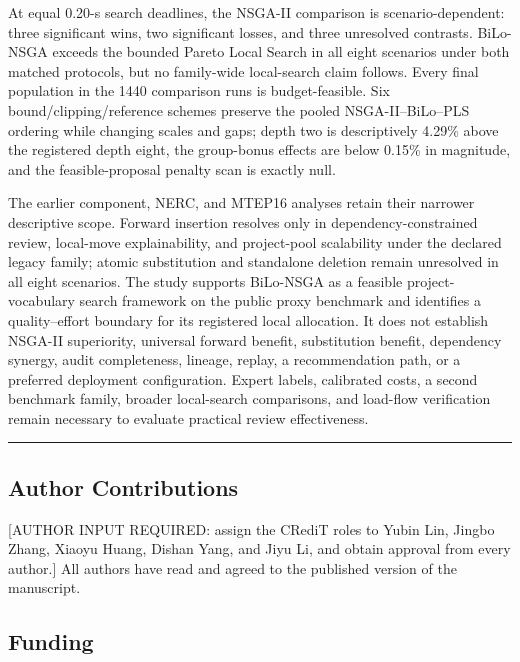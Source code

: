 \documentclass[
]{article}
\begin{document}
At equal 0.20-s search deadlines, the NSGA-II comparison is scenario-dependent: three significant wins, two significant losses, and three unresolved contrasts. BiLo-NSGA exceeds the bounded Pareto Local Search in all eight scenarios under both matched protocols, but no family-wide local-search claim follows. Every final population in the 1440 comparison runs is budget-feasible. Six bound/clipping/reference schemes preserve the pooled NSGA-II--BiLo--PLS ordering while changing scales and gaps; depth two is descriptively 4.29\% above the registered depth eight, the group-bonus effects are below 0.15\% in magnitude, and the feasible-proposal penalty scan is exactly null.

The earlier component, NERC, and MTEP16 analyses retain their narrower descriptive scope. Forward insertion resolves only in dependency-constrained review, local-move explainability, and project-pool scalability under the declared legacy family; atomic substitution and standalone deletion remain unresolved in all eight scenarios. The study supports BiLo-NSGA as a feasible project-vocabulary search framework on the public proxy benchmark and identifies a quality--effort boundary for its registered local allocation. It does not establish NSGA-II superiority, universal forward benefit, substitution benefit, dependency synergy, audit completeness, lineage, replay, a recommendation path, or a preferred deployment configuration. Expert labels, calibrated costs, a second benchmark family, broader local-search comparisons, and load-flow verification remain necessary to evaluate practical review effectiveness.

\begin{center}\rule{0.5\linewidth}{0.5pt}\end{center}

\subsection{Author Contributions}\label{author-contributions}

{[}AUTHOR INPUT REQUIRED: assign the CRediT roles to Yubin Lin, Jingbo Zhang, Xiaoyu Huang, Dishan Yang, and Jiyu Li, and obtain approval from every author.{]} All authors have read and agreed to the published version of the manuscript.

\subsection{Funding}\label{funding}
\end{document}
